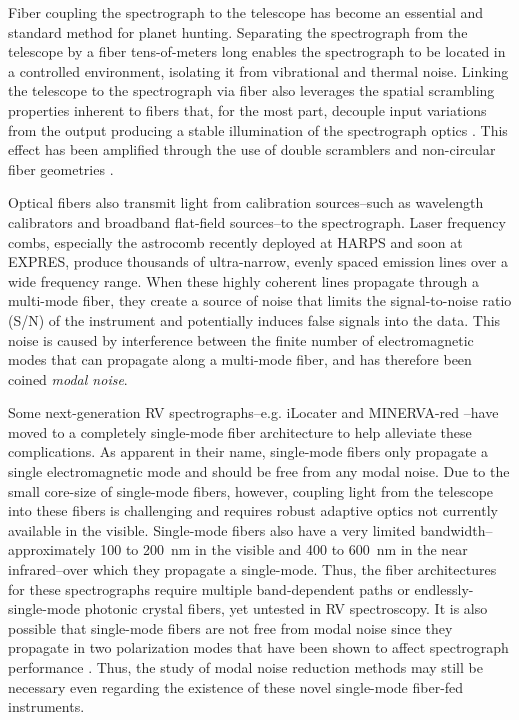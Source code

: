 \documentclass[twocolumn]{emulateapj}
\begin{document}
Fiber coupling the spectrograph to the telescope has become an essential and standard method for planet hunting. Separating the spectrograph from the telescope by a fiber tens-of-meters long enables the spectrograph to be located in a controlled environment, isolating it from vibrational and thermal noise. Linking the telescope to the spectrograph via fiber also leverages the spatial scrambling properties inherent to fibers that, for the most part, decouple input variations from the output producing a stable illumination of the spectrograph optics \citep{Hunter1992}. This effect has been amplified through the use of double scramblers \citep{Halverson2015a, Spronck2015} and non-circular fiber geometries \citep{Chazelas2010, Spronck2012, Plavchan2013}.

Optical fibers also transmit light from calibration sources--such as wavelength calibrators and broadband flat-field sources--to the spectrograph. Laser frequency combs, especially the  astrocomb \citep{Probst2014} recently deployed at HARPS and soon at EXPRES, produce thousands of ultra-narrow, evenly spaced emission lines over a wide frequency range. When these highly coherent lines propagate through a multi-mode fiber, they create a source of noise that limits the signal-to-noise ratio (S/N) of the instrument and potentially induces false signals into the data. This noise is caused by interference between the finite number of electromagnetic modes that can propagate along a multi-mode fiber, and has therefore been coined \textit{modal noise}.

Some next-generation RV spectrographs--e.g. iLocater \citep{Crepp2016} and MINERVA-red \citep{Blake2015}--have moved to a completely single-mode fiber architecture to help alleviate these complications. As apparent in their name, single-mode fibers only propagate a single electromagnetic mode and should be free from any modal noise. Due to the small core-size of single-mode fibers, however, coupling light from the telescope into these fibers is challenging and requires robust adaptive optics not currently available in the visible. Single-mode fibers also have a very limited bandwidth--approximately 100 to \SI{200}{\nano\meter} in the visible and 400 to \SI{600}{\nano\meter} in the near infrared--over which they propagate a single-mode. Thus, the fiber architectures for these spectrographs require multiple band-dependent paths or endlessly-single-mode photonic crystal fibers, yet untested in RV spectroscopy. It is also possible that single-mode fibers are not free from modal noise since they propagate in two polarization modes that have been shown to affect spectrograph performance \citep{Halverson2015b}. Thus, the study of modal noise reduction methods may still be necessary even regarding the existence of these novel single-mode fiber-fed instruments.
\end{document}
